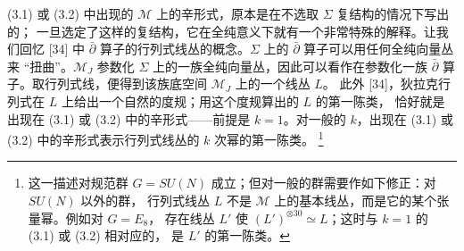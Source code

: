 \documentclass[11pt,a4paper]{article}
\begin{document}

(3.1) 或 (3.2) 中出现的 $\mathcal{M}$ 上的辛形式，原本是在不选取 $\Sigma$ 复结构的情况下写出的；
一旦选定了这样的复结构，它在全纯意义下就有一个非常特殊的解释。让我们回忆 [34] 中
$\bar\partial$ 算子的行列式线丛的概念。$\Sigma$ 上的 $\bar\partial$ 算子可以用任何全纯向量丛来
“扭曲”。$\mathcal{M}_J$ 参数化 $\Sigma$ 上的一族全纯向量丛，因此可以看作在参数化一族
$\bar\partial$ 算子。取行列式线，便得到该族底空间 $\mathcal{M}_J$ 上的一个线丛 $L$。
此外 [34]，狄拉克行列式在 $L$ 上给出一个自然的度规；用这个度规算出的 $L$ 的第一陈类，
恰好就是出现在 (3.1) 或 (3.2) 中的辛形式——前提是 $k=1$。对一般的 $k$，出现在 (3.1) 或
(3.2) 中的辛形式表示行列式线丛的 $k$ 次幂的第一陈类。%
\footnote{这一描述对规范群 $G=SU(N)$ 成立；但对一般的群需要作如下修正：对 $SU(N)$ 以外的群，
行列式线丛 $L$ 不是 $\mathcal{M}$ 上的基本线丛，而是它的某个张量幂。例如对 $G=E_8$，
存在线丛 $L'$ 使 $(L')^{\otimes 30}\simeq L$；这时与 $k=1$ 的 (3.1) 或 (3.2) 相对应的，
是 $L'$ 的第一陈类。}

\end{document}
